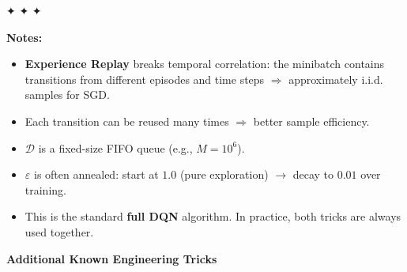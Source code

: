 \documentclass[11pt]{article}
\providecommand{\tightlist}{%
      \setlength{\itemsep}{0pt}\setlength{\parskip}{0pt}}
\begin{document}
✦ ✦ ✦

\textbf{Notes:}

\begin{itemize}
\tightlist
\item
  \textbf{Experience Replay} breaks temporal correlation: the minibatch
  contains transitions from different episodes and time steps
  \(\Rightarrow\) approximately i.i.d. samples for SGD.
\item
  Each transition can be reused many times \(\Rightarrow\) better sample
  efficiency.
\item
  \(\mathcal{D}\) is a fixed-size FIFO queue (e.g., \(M = 10^6\)).
\item
  \(\varepsilon\) is often annealed: start at \(1.0\) (pure exploration)
  \(\to\) decay to \(0.01\) over training.
\item
  This is the standard \textbf{full DQN} algorithm. In practice, both
  tricks are always used together.
\end{itemize}

    \label{tricks-3-3}

    \textbf{Additional Known Engineering Tricks}
\end{document}
